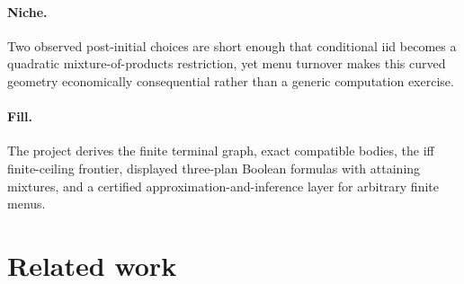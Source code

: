 \documentclass{article}
\begin{document}
\paragraph{Niche.} Two observed post-initial choices are short enough that conditional iid becomes a quadratic mixture-of-products restriction, yet menu turnover makes this curved geometry economically consequential rather than a generic computation exercise.

\paragraph{Fill.} The project derives the finite terminal graph, exact compatible bodies, the iff finite-ceiling frontier, displayed three-plan Boolean formulas with attaining mixtures, and a certified approximation-and-inference layer for arbitrary finite menus.

\section{Related work}
\end{document}
